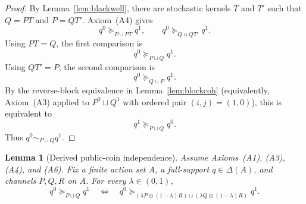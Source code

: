 \documentclass[11pt,a4paper]{article}
\newtheorem{lemma}[theorem]{Lemma}
\theoremstyle{definition}
\newcommand{\1}{\mathbf 1}
\begin{document}
\begin{proof}
By Lemma~\ref{lem:blackwell}, there are stochastic kernels $T$ and $T'$ such that $Q=PT$ and $P=QT'$.  Axiom~\textup{(A4)}
gives
\[
q^0\succeq_{P\sqcup PT}q^1,
\qquad
q^0\succeq_{Q\sqcup QT'}q^1.
\]
Using $PT=Q$, the first comparison is
\[
q^0\succeq_{P\sqcup Q}q^1.
\]
Using $QT'=P$, the second comparison is
\[
q^0\succeq_{Q\sqcup P}q^1.
\]
By the reverse-block equivalence in Lemma~\ref{lem:blockcoh} (equivalently, Axiom~\textup{(A3)} applied to
$P^0\sqcup Q^1$ with ordered pair $(i,j)=(1,0)$), this is equivalent to
\[
q^1\succeq_{P\sqcup Q}q^0.
\]
Thus $q^0\sim_{P\sqcup Q}q^1$.
\end{proof}

\begin{lemma}[Derived public-coin independence]\label{lem:publiccoin}
Assume Axioms~\textup{(A1)}, \textup{(A3)}, \textup{(A4)}, and \textup{(A6)}.  Fix a finite action set $A$, a
full-support $q\in\Delta(A)$, and channels $P,Q,R$ on $A$.  For every $\lambda\in(0,1)$,
\[
q^0\succeq_{P\sqcup Q}q^1
\quad\Longleftrightarrow\quad
q^0\succeq_{(\lambda P\oplus(1-\lambda)R)\sqcup(\lambda Q\oplus(1-\lambda)R)}q^1.
\]
\end{lemma}
\end{document}
